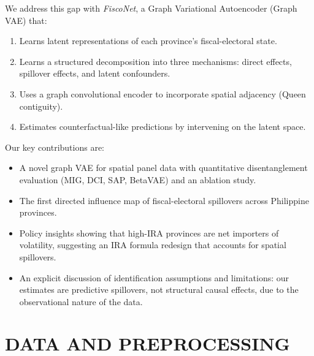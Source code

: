 \documentclass[conference]{IEEEtran}
\begin{document}
We address this gap with \textit{FiscoNet}, a Graph Variational Autoencoder (Graph VAE) that:
\begin{enumerate}
\item Learns latent representations of each province's fiscal-electoral state.
\item Learns a structured decomposition into three mechanisms: direct effects, spillover effects, and latent confounders.
\item Uses a graph convolutional encoder to incorporate spatial adjacency (Queen contiguity).
\item Estimates counterfactual-like predictions by intervening on the latent space.
\end{enumerate}

Our key contributions are:
\begin{itemize}
\item A novel graph VAE for spatial panel data with quantitative disentanglement evaluation (MIG, DCI, SAP, BetaVAE) and an ablation study.
\item The first directed influence map of fiscal-electoral spillovers across Philippine provinces.
\item Policy insights showing that high-IRA provinces are net importers of volatility, suggesting an IRA formula redesign that accounts for spatial spillovers.
\item An explicit discussion of identification assumptions and limitations: our estimates are predictive spillovers, not structural causal effects, due to the observational nature of the data.
\end{itemize}

\section{DATA AND PREPROCESSING}
\end{document}
